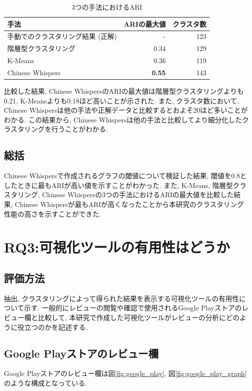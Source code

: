 \begin{table}[H]
  \caption{3つの手法におけるARI}
  \label{tb:two_ari}
  \begin{center}
  \begin{tabularx}{\linewidth}{X|r|r}
    \hline
    手法&ARIの最大値&クラスタ数\\\hline\hline
    手動でのクラスタリング結果 (正解) &-&123\\\hline
    階層型クラスタリング&0.34&129\\\hline
    K-Means&0.36&119\\\hline
    Chinese Whispers&\textbf{0.55}&143\\\hline
  \end{tabularx}\end{center}
\end{table}

比較した結果, Chinese WhispersのARIの最大値は階層型クラスタリングよりも0.21, K-Meansよりも0.18ほど高いことが示された. また, クラスタ数において, Chinese Whispersは他の手法や正解データと比較するとおよそ20ほど多いことがわかる. 
この結果から, Chinese Whispersは他の手法と比較してより細分化したクラスタリングを行うことがわかる. 

\subsection{総括}
Chinese Whispersで作成されるグラフの閾値について検証した結果, 閾値を0.8としたときに最もARIが高い値を示すことがわかった. 
また, K-Means, 階層型クラスタリング, Chinese Whispersの3つの手法におけるARIの最大値を比較した結果, Chinese Whispersが最もARIが高くなったことから本研究のクラスタリング性能の高さを示すことができた. 


\section{RQ3:可視化ツールの有用性はどうか}
\subsection{評価方法}
抽出, クラスタリングによって得られた結果を表示する可視化ツールの有用性について示す. 一般的にレビューの閲覧や確認で使用されるGoogle Playストアのレビュー欄と比較して, 本研究で作成した可視化ツールがレビューの分析にどのように役立つのかを記述する. 

\subsection{Google Playストアのレビュー欄}
Google Playストアのレビュー欄は図\ref{fig:google_play}, 図\ref{fig:google_play_graph}のような構成となっている. 

